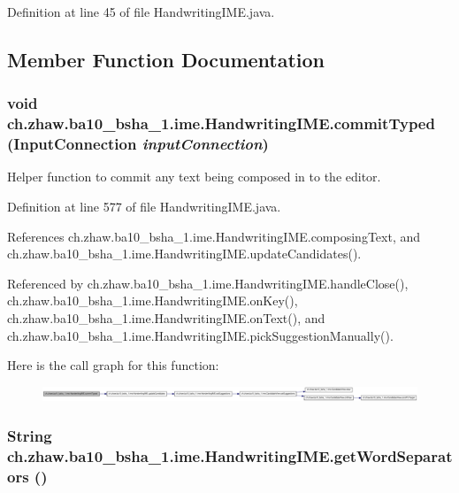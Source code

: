 Definition at line 45 of file HandwritingIME.java.

\subsection{Member Function Documentation}
\hypertarget{classch_1_1zhaw_1_1ba10__bsha__1_1_1ime_1_1HandwritingIME_a3f0ca3d6a23ac27b9ad1b2578078512e}{
\subsubsection[{commitTyped}]{\setlength{\rightskip}{0pt plus 5cm}void ch.zhaw.ba10\_\-bsha\_\-1.ime.HandwritingIME.commitTyped (InputConnection {\em inputConnection})}}
\label{classch_1_1zhaw_1_1ba10__bsha__1_1_1ime_1_1HandwritingIME_a3f0ca3d6a23ac27b9ad1b2578078512e}
Helper function to commit any text being composed in to the editor. 

Definition at line 577 of file HandwritingIME.java.

References ch.zhaw.ba10\_\-bsha\_\-1.ime.HandwritingIME.composingText, and ch.zhaw.ba10\_\-bsha\_\-1.ime.HandwritingIME.updateCandidates().

Referenced by ch.zhaw.ba10\_\-bsha\_\-1.ime.HandwritingIME.handleClose(), ch.zhaw.ba10\_\-bsha\_\-1.ime.HandwritingIME.onKey(), ch.zhaw.ba10\_\-bsha\_\-1.ime.HandwritingIME.onText(), and ch.zhaw.ba10\_\-bsha\_\-1.ime.HandwritingIME.pickSuggestionManually().

Here is the call graph for this function:\nopagebreak
\begin{figure}[H]
\begin{center}
\leavevmode
\includegraphics[width=420pt]{classch_1_1zhaw_1_1ba10__bsha__1_1_1ime_1_1HandwritingIME_a3f0ca3d6a23ac27b9ad1b2578078512e_cgraph}
\end{center}
\end{figure}
\hypertarget{classch_1_1zhaw_1_1ba10__bsha__1_1_1ime_1_1HandwritingIME_aedc68ffb6a0f14256976a0cfdb5a8a3d}{
\subsubsection[{getWordSeparators}]{\setlength{\rightskip}{0pt plus 5cm}String ch.zhaw.ba10\_\-bsha\_\-1.ime.HandwritingIME.getWordSeparators ()}}
\label{classch_1_1zhaw_1_1ba10__bsha__1_1_1ime_1_1HandwritingIME_aedc68ffb6a0f14256976a0cfdb5a8a3d}


